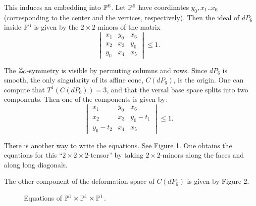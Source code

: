 \documentclass[11pt, english]{article}
\begin{document}
This induces an embedding into $\mathbb{P}^6$. Let $\mathbb{P}^6$ have coordinates $y_0,x_1..x_6$ (corresponding to the center and the vertices, respectively). Then the ideal of $dP_6$ inside $\mathbb{P}^6$ is given by the $2 \times 2$-minors of the matrix
\begin{equation}
\label{eqdp6}
\begin{vmatrix}
x_1 & y_0 & x_6 \\
x_2 & x_3 & y_0 \\
y_0 & x_4 & x_5
\end{vmatrix} \leq 1.
\end{equation}

The $\mathbb{Z}_6$-symmetry is visible by permuting columns and rows. Since $dP_6$ is smooth, the only singularity of its affine cone, $C(dP_6)$, is the origin. One can compute that $T^1(C(dP_6))=3$, and that the versal base space splits into two components. Then one of the components is given by:
\[
\begin{vmatrix}
x_1 & y_0 & x_6 \\
x_2 & x_3 & y_0-t_1 \\
y_0-t_2 & x_4 & x_5
\end{vmatrix} \leq 1.
\]

There is another way to write the equations. See Figure 1. One obtains the equations for this ``$2 \times 2 \times 2$-tensor'' by taking $2 \times 2$-minors along the faces and along long diagonals.

The other component of the deformation space of $C(dP_6)$ is given by Figure 2.

\begin{figure}
\centering 
  \caption{Equations of $\mathbb{P}^1 \times \mathbb{P}^1 \times \mathbb{P}^1$.}
\end{figure}
\end{document}
